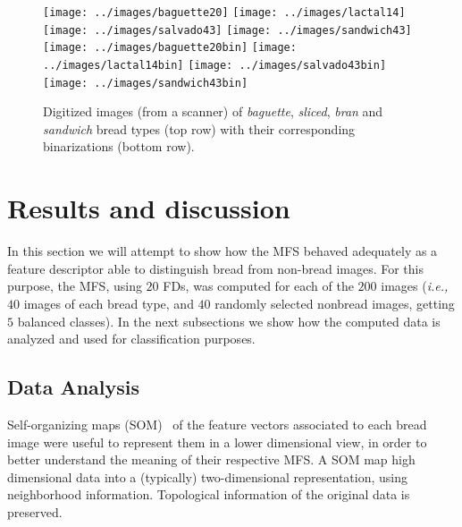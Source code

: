 
\begin{figure}[htb]
\centering
\texttt{[image: ../images/baguette20]}
\texttt{[image: ../images/lactal14]}
\texttt{[image: ../images/salvado43]}
\texttt{[image: ../images/sandwich43]}
\texttt{[image: ../images/baguette20bin]}
\texttt{[image: ../images/lactal14bin]}
\texttt{[image: ../images/salvado43bin]}
\texttt{[image: ../images/sandwich43bin]}
\caption{Digitized images (from a scanner) of {\em baguette}, {\em sliced}, {\em bran} and {\em sandwich} bread types (top row) with their corresponding binarizations (bottom row).}
\label{fig:bread}
\end{figure}


\section{Results and discussion}
\label{sec:9}

In this section we will attempt to show how the MFS behaved adequately as a feature descriptor able to distinguish bread from non-bread images. For this purpose, the MFS, using $20$ FDs, was computed for each of the $200$ images ({\em i.e.,} $40$ images of each bread type, and $40$ randomly selected nonbread images, getting $5$ balanced classes). In the next subsections we show how the computed data is analyzed and used for classification purposes.


\subsection{Data Analysis}
\label{sec:11}

Self-organizing maps (SOM)~\cite{Kohonen2001} of the feature vectors associated to each bread image were useful to represent them in a lower dimensional view, in order to better understand the meaning of their respective MFS. A SOM map high dimensional data into a (typically) two-dimensional representation, using neighborhood information. Topological information of the original data is preserved.


